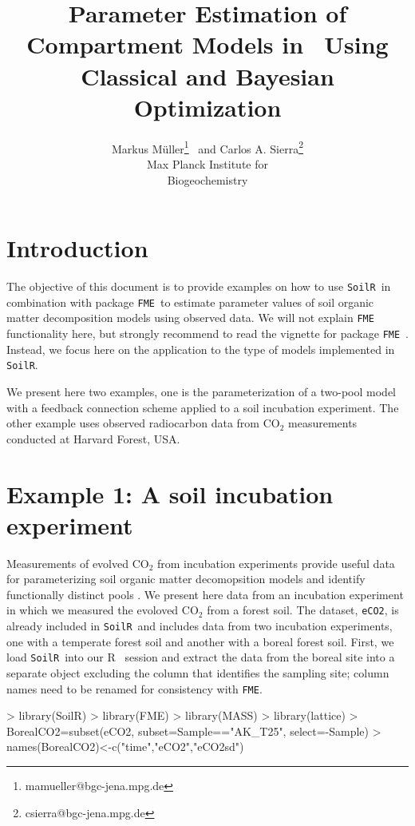 \documentclass[a4paper]{article}
\title{Parameter Estimation of Compartment Models in \SoilR \, Using Classical and Bayesian Optimization}
\author{Markus M\"uller\thanks{mamueller@bgc-jena.mpg.de} \ 
     and Carlos A. Sierra\thanks{csierra@bgc-jena.mpg.de} \\ 
         Max Planck Institute for \\
         Biogeochemistry }
\newcommand{\R}{\textsf{R }}
\newcommand{\SoilR}{\texttt{SoilR}}
\newcommand{\FME}{\texttt{FME}}
\begin{document}

\maketitle



\section*{Introduction}
The objective of this document is to provide examples on how to use \SoilR \, in combination with package \FME \,
to estimate parameter values of soil organic matter decomposition models using observed 
data. We will not explain \FME \, functionality here, but strongly recommend to read the vignette for package \FME \, \citep{Soetaert}.
Instead, we focus here on the application to the type of models implemented in \SoilR. 

We present here two examples, one is the parameterization of a two-pool model with a feedback connection scheme applied to a soil incubation experiment. The other example uses observed radiocarbon data from CO$_2$ measurements conducted at Harvard Forest, USA. 

\section*{Example 1: A soil incubation experiment}
Measurements of evolved CO$_2$ from incubation experiments provide useful data for parameterizing soil organic matter decomopsition models and identify functionally distinct pools \citep{Schadel}. We present here data from an incubation experiment in which we measured the evoloved CO$_2$ from a forest soil. The dataset, {\tt eCO2}, is already included in \SoilR \, and includes data from two incubation experiments, one with a temperate forest soil and another with a boreal forest soil. First, we load \SoilR \, into our \R \, session and extract the data from the boreal site into a separate object excluding the column that identifies the sampling site; column names need to be renamed for consistency with \FME.

\begin{Schunk}
\begin{Sinput}
> library(SoilR)
> library(FME)
> library(MASS)
> library(lattice)
> BorealCO2=subset(eCO2, subset=Sample=="AK_T25", select=-Sample)
> names(BorealCO2)<-c("time","eCO2","eCO2sd")
\end{Sinput}
\end{Schunk}
\end{document}
